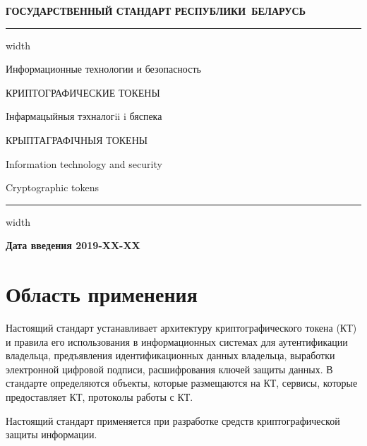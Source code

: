 \newpage
\setcounter{page}{1}
\pagestyle{headings}

\begin{center}
{\bfseries
ГОСУДАРСТВЕННЫЙ СТАНДАРТ РЕСПУБЛИКИ~БЕЛАРУСЬ
\vskip 2pt
\hrule width\textwidth

\vskip 9pt

Информационные технологии и безопасность

КРИПТОГРАФИЧЕСКИЕ ТОКЕНЫ

\vskip 9pt

Iнфармацыйныя тэхналогii i бяспека

КРЫПТАГРАФIЧНЫЯ ТОКЕНЫ
} %

\vskip 9pt

Information technology and security

Cryptographic tokens

\vskip 4pt                
\hrule width \textwidth
\end{center}

\mbox{}\hfill{\bfseries Дата введения 2019-XX-XX}

\chapter{Область применения}

Настоящий стандарт устанавливает архитектуру
криптографического токена (КТ) и правила его
использования в информационных системах для аутентификации владельца, 
предъявления идентификационных данных владельца, выработки электронной цифровой 
подписи, расшифрования ключей защиты данных.
%
В стандарте определяются объекты, которые размещаются на КТ,
сервисы, которые предоставляет КТ, протоколы работы с КТ.

Настоящий стандарт применяется при разработке средств криптографической 
защиты информации.

